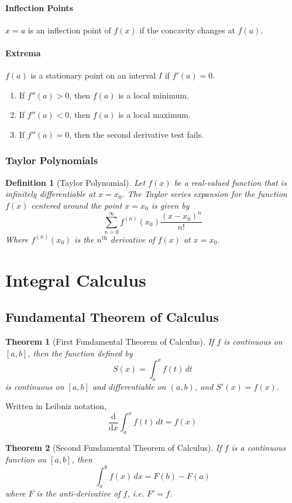 \documentclass[12pt]{article}
\newcommand{\diff}[1]{\frac{\mathrm{d}}{\mathrm{d}#1}}
\newtheorem{thrm}{Theorem}
\newtheorem{defn}{Definition}
\begin{document}
\paragraph{Inflection Points}
$x = a$ is an inflection point of $f(x)$ if the concavity changes at $f(a)$.
\paragraph{Extrema}
$f(a)$ is a stationary point on an interval $I$ if $f'(a) = 0$.
\begin{enumerate}
	\item If $f''(a) > 0$, then $f(a)$ is a local minimum.
	\item If $f''(a)< 0$, then $f(a)$ is a local maximum.
	\item If $f''(a)= 0$, then the second derivative test fails.
\end{enumerate}

\subsubsection{Taylor Polynomials}
\begin{defn}[Taylor Polynomial]
\label{taylorpoly}
Let $f(x)$ be a real-valued function that is infinitely differentiable at $x = x_0$. The Taylor series expansion for the function $f(x)$ centered around the point $x = x_0$ is given by
$$\sum_{n=0}^{\infty}f^{(n)}(x_0)\frac{(x - x_0)^{n}}{n!}$$
Where $f^{(n)}(x_0)$ is the $n^\text{th}$ derivative of $f(x)$ at $x = x_0$.
\end{defn}



\section{Integral Calculus}
\subsection{Fundamental Theorem of Calculus}
\begin{thrm}[First Fundamental Theorem of Calculus]
	\label{ftc}
	If $f$ is continuous on $[a,b]$, then the function defined by
	$$S(x)=\int _{ a }^{ x }{ f(t)\, dt }$$
	is continuous on $[a,b]$ and differentiable on $(a,b)$, and $S'(x)=f(x)$.
\end{thrm}
Written in Leibniz notation,
$$\diff{x}\int_{a}^{x} f(t)\, dt = f(x)$$

\begin{thrm}[Second Fundamental Theorem of Calculus]
	If $f$ is a continuous function on $[a,b]$, then	
	$$\int _{ a }^{ b }{ f(x)\, dx=F(b)-F(a)}$$
	where $F$ is the anti-derivative of $f$, i.e. $F'=f$.
\end{thrm}
\end{document}
